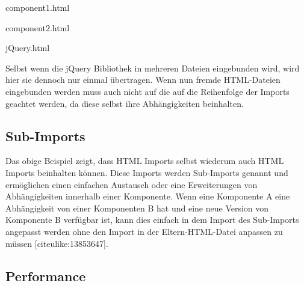 component1.html

\begin{Shaded}
\begin{Highlighting}[]
\end{Highlighting}
\end{Shaded}

component2.html

\begin{Shaded}
\begin{Highlighting}[]
\end{Highlighting}
\end{Shaded}

jQuery.html

\begin{Shaded}
\begin{Highlighting}[]
\end{Highlighting}
\end{Shaded}

Selbst wenn die jQuery Bibliothek in mehreren Dateien eingebunden wird,
wird hier sie dennoch nur einmal übertragen. Wenn nun fremde
HTML-Dateien eingebunden werden muss auch nicht auf die auf die
Reihenfolge der Imports geachtet werden, da diese selbst ihre
Abhängigkeiten beinhalten.

\subsection{Sub-Imports}\label{sub-imports}

Das obige Beispiel zeigt, dass HTML Imports selbst wiederum auch HTML
Imports beinhalten können. Diese Imports werden Sub-Imports genannt und
ermöglichen einen einfachen Austausch oder eine Erweiterungen von
Abhängigkeiten innerhalb einer Komponente. Wenn eine Komponente A eine
Abhängigkeit von einer Komponenten B hat und eine neue Version von
Komponente B verfügbar ist, kann dies einfach in dem Import des
Sub-Imports angepasst werden ohne den Import in der Eltern-HTML-Datei
anpassen zu müssen {[}citeulike:13853647{]}.

\subsection{Performance}\label{performance}

